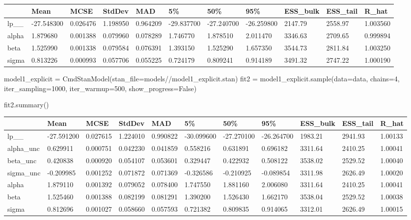 \documentclass[
  letterpaper,
  DIV=11,
  numbers=noendperiod]{scrartcl}
\newenvironment{Shaded}{\begin{snugshade}}{\end{snugshade}}
\newcommand{\DecValTok}[1]{\textcolor[rgb]{0.68,0.00,0.00}{#1}}
\newcommand{\NormalTok}[1]{\textcolor[rgb]{0.00,0.23,0.31}{#1}}
\newcommand{\OperatorTok}[1]{\textcolor[rgb]{0.37,0.37,0.37}{#1}}
\newcommand{\StringTok}[1]{\textcolor[rgb]{0.13,0.47,0.30}{#1}}
\newcommand{\VariableTok}[1]{\textcolor[rgb]{0.07,0.07,0.07}{#1}}
\begin{document}
\begin{longtable}[]{@{}lllllllllll@{}}
\toprule\noalign{}
& Mean & MCSE & StdDev & MAD & 5\% & 50\% & 95\% & ESS\_bulk & ESS\_tail
& R\_hat \\
\midrule\noalign{}
\endhead
\bottomrule\noalign{}
\endlastfoot
lp\_\_ & -27.548300 & 0.026476 & 1.198950 & 0.964209 & -29.837700 &
-27.240700 & -26.259800 & 2147.79 & 2558.97 & 1.003560 \\
alpha & 1.879680 & 0.001388 & 0.079960 & 0.078289 & 1.746770 & 1.878510
& 2.011470 & 3346.63 & 2709.65 & 0.999894 \\
beta & 1.525990 & 0.001338 & 0.079584 & 0.076391 & 1.393150 & 1.525290 &
1.657350 & 3544.73 & 2811.84 & 1.003250 \\
sigma & 0.813226 & 0.000993 & 0.057706 & 0.055225 & 0.724179 & 0.809241
& 0.914189 & 3491.32 & 2747.22 & 1.000190 \\
\end{longtable}

\begin{Shaded}
\begin{Highlighting}[]
\NormalTok{model1\_explicit }\OperatorTok{=}\NormalTok{ CmdStanModel(stan\_file}\OperatorTok{=}\StringTok{\textquotesingle{}models//model1\_explicit.stan\textquotesingle{}}\NormalTok{)}
\NormalTok{fit2 }\OperatorTok{=}\NormalTok{ model1\_explicit.sample(data}\OperatorTok{=}\NormalTok{data, chains}\OperatorTok{=}\DecValTok{4}\NormalTok{, iter\_sampling}\OperatorTok{=}\DecValTok{1000}\NormalTok{, iter\_warmup}\OperatorTok{=}\DecValTok{500}\NormalTok{, show\_progress}\OperatorTok{=}\VariableTok{False}\NormalTok{)}

\NormalTok{fit2.summary()}
\end{Highlighting}
\end{Shaded}

\begin{longtable}[]{@{}lllllllllll@{}}
\toprule\noalign{}
& Mean & MCSE & StdDev & MAD & 5\% & 50\% & 95\% & ESS\_bulk & ESS\_tail
& R\_hat \\
\midrule\noalign{}
\endhead
\bottomrule\noalign{}
\endlastfoot
lp\_\_ & -27.591200 & 0.027615 & 1.224010 & 0.990822 & -30.099600 &
-27.270100 & -26.264700 & 1983.21 & 2941.93 & 1.00133 \\
alpha\_unc & 0.629911 & 0.000751 & 0.042230 & 0.041859 & 0.558216 &
0.631891 & 0.696182 & 3311.64 & 2410.25 & 1.00041 \\
beta\_unc & 0.420838 & 0.000920 & 0.054107 & 0.053601 & 0.329447 &
0.422932 & 0.508122 & 3538.02 & 2529.52 & 1.00040 \\
sigma\_unc & -0.209985 & 0.001252 & 0.071872 & 0.071369 & -0.326586 &
-0.210925 & -0.089854 & 3311.98 & 2626.49 & 1.00020 \\
alpha & 1.879110 & 0.001392 & 0.079052 & 0.078400 & 1.747550 & 1.881160
& 2.006080 & 3311.64 & 2410.25 & 1.00041 \\
beta & 1.525460 & 0.001388 & 0.082199 & 0.081291 & 1.390200 & 1.526430 &
1.662170 & 3538.04 & 2529.52 & 1.00038 \\
sigma & 0.812696 & 0.001027 & 0.058660 & 0.057593 & 0.721382 & 0.809835
& 0.914065 & 3312.01 & 2626.49 & 1.00015 \\
\end{longtable}
\end{document}
